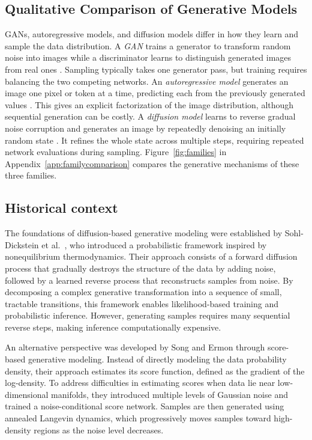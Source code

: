\subsection{Qualitative Comparison of Generative Models}\label{sec:generator-comparison}
GANs, autoregressive models, and diffusion models differ in how they
learn and sample the data distribution.
A \emph{GAN} trains a generator to transform random noise into images while
a discriminator learns to distinguish generated images from real ones
\cite{goodfellow2014gan}. Sampling typically takes one generator pass,
but training requires balancing the two competing networks.
An \emph{autoregressive model} generates an image one pixel or token at a
time, predicting each from the previously generated values
\cite{oord2016pixelrnn}. This gives an explicit factorization of the image
distribution, although sequential generation can be costly.
A \emph{diffusion model} learns to reverse gradual noise corruption and
generates an image by repeatedly denoising an initially random state
\cite{ho2020ddpm}. It refines the whole state across multiple steps,
requiring repeated network evaluations during sampling.
Figure~\ref{fig:families} in Appendix~\ref{app:familycomparison}
compares the generative mechanisms of these three families.

\subsection{Historical context}\label{sec:history}

The foundations of diffusion-based generative modeling were established
by Sohl-Dickstein et al.\ \cite{sohl2015diffusion}, who introduced a
probabilistic framework inspired by nonequilibrium thermodynamics.
Their approach consists of a forward diffusion process that gradually
destroys the structure of the data by adding noise, followed by a
learned reverse process that reconstructs samples from noise.
By decomposing a complex generative transformation into a sequence
of small, tractable transitions, this framework enables likelihood-based
training and probabilistic inference. However, generating samples
requires many sequential reverse steps, making inference computationally
expensive.

An alternative perspective was developed by Song and Ermon
\cite{song2019score} through score-based generative modeling.
Instead of directly modeling the data probability density, their
approach estimates its score function, defined as the gradient of
the log-density. To address difficulties in estimating scores when
data lie near low-dimensional manifolds, they introduced multiple
levels of Gaussian noise and trained a noise-conditional score
network. Samples are then generated using annealed Langevin dynamics,
which progressively moves samples toward high-density regions
as the noise level decreases.

